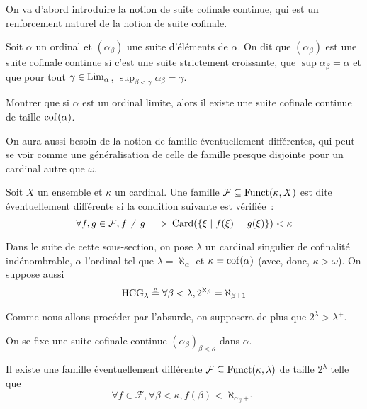 On va d'abord introduire la notion de suite cofinale continue, qui est un
renforcement naturel de la notion de suite cofinale.

\begin{definition}
  Soit $\alpha$ un ordinal et $(\alpha_\beta)$ une suite d'éléments de $\alpha$.
  On dit que $(\alpha_\beta)$ est une suite cofinale continue si c'est une
  suite strictement croissante, que $\sup\alpha_\beta = \alpha$ et que pour
  tout $\gamma \in\operatorname{Lim}_\alpha$, $\sup_{\beta < \gamma} \alpha_\beta = \gamma$.
\end{definition}

\begin{exercise}
  Montrer que si $\alpha$ est un ordinal limite, alors il existe une suite
  cofinale continue de taille $\operatorname{cof}(\alpha)$.
\end{exercise}

On aura aussi besoin de la notion de famille éventuellement différentes, qui
peut se voir comme une généralisation de celle de famille presque disjointe pour
un cardinal autre que $\omega$.

\begin{definition}
  Soit $X$ un ensemble et $\kappa$ un cardinal. Une famille
  $\mathcal F\subseteq\operatorname{Funct}(\kappa,X)$ est dite éventuellement différente si
  la condition suivante est vérifiée~:
  \[\forall f,g \in \mathcal F, f \neq g \implies
  \operatorname{Card}(\{\xi\mid f(\xi) = g(\xi)\}) < \kappa\]
\end{definition}

\begin{notation}
  Dans le suite de cette sous-section, on pose $\lambda$ un cardinal singulier
  de cofinalité indénombrable, $\alpha$ l'ordinal tel que
  $\lambda = \aleph_\alpha$ et $\kappa = \operatorname{cof}(\alpha)$ (avec, donc,
  $\kappa > \omega$). On suppose aussi
  \[\operatorname{HCG}_\lambda \triangleq \forall \beta < \lambda, 2^{\aleph_\beta} = \aleph_{\beta + 1}
  \]

  Comme nous allons procéder par l'absurde, on supposera de plus que
  $2^\lambda > \lambda^+$.

  On se fixe une suite cofinale continue $(\alpha_{\beta})_{\beta < \kappa}$ dans
  $\alpha$.
\end{notation}

\begin{proposition}
  Il existe une famille éventuellement différente
  $\mathcal F\subseteq\operatorname{Funct}(\kappa,\lambda)$ de taille $2^\lambda$ telle que
  \[\forall f\in\mathcal F, \forall \beta < \kappa,
  f(\beta) < \aleph_{\alpha_\beta + 1}\]
\end{proposition}


